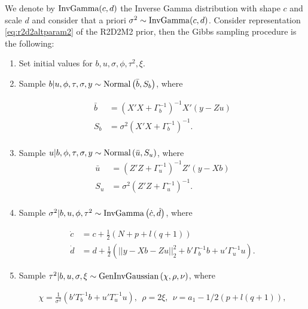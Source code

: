 	We denote by $\text{InvGamma}(c,d)$ the Inverse Gamma distribution with shape $c$ and scale $d$ and consider that a priori  $\sigma^2 \sim \text{InvGamma}(c,d)$. Consider representation \eqref{eq:r2d2altparam2} of the R2D2M2 prior, then the Gibbs sampling procedure is the following:

	\begin{enumerate}
		\item Set initial values for $b, u, \sigma, \phi, \tau^2, \xi$.
		\item Sample $b | u, \phi, \tau, \sigma, y  \sim \text{Normal} \left(  \bar{b}  , S_{b} \right)$, where

		\begin{align*}
		    \bar{b}&= \left(X'X+ \Gamma_b^{-1} \right)^{-1} X'(y-Zu) \\
		    S_b&= \sigma^2 \left(X'X+ \Gamma_b^{-1} \right)^{-1}. \\
 		\end{align*}
		\item Sample $u | b, \phi, \tau, \sigma, y \sim \text{Normal} \left(  \bar{u}  , S_{u} \right)$, where
		\begin{align*}
		    \bar{u}&= \left(Z'Z+ \Gamma_u^{-1} \right)^{-1} Z'(y-Xb) \\
		    S_u&= \sigma^2 \left(Z'Z+ \Gamma_u^{-1} \right)^{-1}. \\
 		\end{align*}

		\item Sample $\sigma^2 |  b, u, \phi, \tau^2  \sim \text{InvGamma} \left(  \dot{c}, \dot{d}   \right)$, where

		\begin{align*}
		  \dot{c}&=c+\frac{1}{2}\left( N+p+l(q+1) \right) \\
		  \dot{d}&=  d+   \frac{1}{2} \left(  ||  y-Xb-Zu||_2^2+  b' \Gamma_{b}^{-1} b + u' \Gamma_{u}^{-1} u \right).
		\end{align*}



		\item Sample  $\tau^2|  b, u, \sigma, \xi \sim \text{GenInvGaussian}  \left( \chi, \rho, \nu \right)$, where

		\begin{align*}
		\chi=  \frac{1}{\sigma^2} \left(   b'   T_b^{-1}b  +  u' T_u^{-1} u    \right), \ \
		\rho= 2\xi , \ \ \nu= a_1- 1/2 \left(p+ l(q+1) \right),  \\
		\end{align*}


\end{enumerate}
